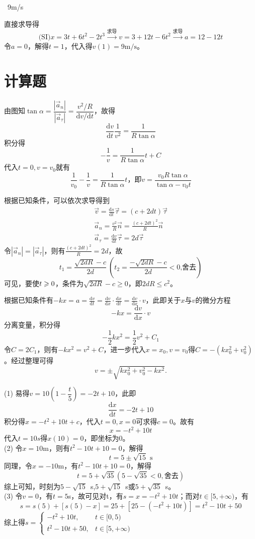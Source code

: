 \documentclass[b5paper,opensource,sourcefont,parskip]{qyxf-book}
\newcommand{\di}[1]{\mathrm{d}#1}
\newcommand{\dy}[2]{\frac{\di{#1}}{\di{#2}}}
\begin{document}
\ 9m/s 

\solve 直接求导得
\[\text{(SI)} x=3t+6t^2-2t^3\xrightarrow{\text{求导}}v=3+12t-6t^2
\xrightarrow{\text{求导}}a=12-12t\]
令$a=0$，解得$t=1$，代入得$v(1)=9\mathrm{m/s}$。

\section{计算题}



\solve 由图知$\tan\alpha=\dfrac{|\vec{a}_n|}{|\vec{a}_\tau|}=\dfrac{v^2/R}{\di{v}/\di{t}}$，故得
\[\dy{v}{t}\frac{1}{v^2}=\frac{1}{R\tan\alpha}\]
积分得
\[-\frac{1}{v}=\frac{1}{R\tan\alpha}t+C\]
代入$t=0,v=v_0$就有
\[\frac{1}{v_0}-\frac{1}{v}=\frac{1}{R\tan\alpha}t
\text{，即}v=\frac{v_0R\tan\alpha}{\tan\alpha-v_0t}
\]


\solve 根据已知条件，可以依次求导得到
\begin{gather*}
\vec{v}=\dy{s}{t}\vec{\tau}=(c+2dt)\vec{\tau}\\  
\vec{a}_n=\frac{v^2}{R}\vec{n}=\frac{(c+2dt)^2}{R}\vec{n}\\
\vec{a}_\tau=\dy{v}{t}\vec{\tau}=2d\vec{\tau}
\end{gather*}
令$|\vec{a}_n|=|\vec{a}_\tau|$，则有$\frac{(c+2dt)^2}{R}=2d$，故
\[t_1=\frac{\sqrt{2dR}-c}{2d}\ \left(t_2=\frac{-\sqrt{2dR}-c}{2d}<0\text{,舍去}\right)\]
可见，要使$t\geqslant\text0$，条件为$\sqrt{2dR}-c\geqslant0$，即$2dR\leqslant c^2$。



\solve 根据已知条件有$-kx=a=\dy{v}{t}=\dy{v}{x}\cdot \dy{x}{t}=\dy{v}{x}\cdot v$，此即关于$x$与$v$的微分方程
\[-kx=\dy{v}{x}\cdot v\]
分离变量，积分得
\[-\dfrac{1}{2}kx^2=\dfrac{1}{2}v^2+C_1\]
令$C=2C_1$，则有$-kx^2=v^2+C$，进一步代入$x=x_0,v=v_0$得$C=-(kx_0^2+v_0^2)$。经过整理可得
\[v=\pm\sqrt{kx_0^2+v_0^2-kx^2}.\]



\solve (1) 易得$v=10\left(1-\dfrac{t}{5}\right)=-2t+10$，此即
\[
\dy{x}{t}=-2t+10
\]
积分得$x=-t^2+10t+c$，代入$t=0,x=0$可求得$c=0$。故有
\[x=-t^2+10t\]
代入$t=10s$得$x(10)=0$，即坐标为0。\\
(2) 令$x=10$m，则有$t^2-10t+10=0$，解得
\[t=5\pm\sqrt{15}\text{ s}\]
同理，令$x=-10$m，有$t^2-10t+10=0$，解得
\[t=5+\sqrt{35}(5-\sqrt{35}<0,\text{舍去})\]
综上可知，时刻为$5-\sqrt{15}$\ s,$5+\sqrt{15}$\ s或$5+\sqrt{35}$\ s。\\
(3) 令$v=0$，有$t=5$s，故可见对t\in[0,5]，有$s=x=-t^2+10t$；而对$t\in[5,+\infty)$，有
\[s=s(5)+[s(5)-x]=25+[25-(-t^2+10t)]=t^2-10t+50\]
综上得$s=
\begin{cases}
-t^2+10t,&t\in[0,5)\\
t^2-10t+50,&t\in[5,+\infty)
\end{cases}$
\end{document}
